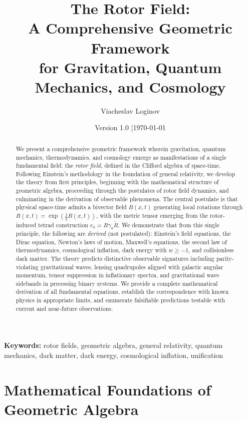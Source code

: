 \documentclass[11pt,a4paper]{article}
\title{\textbf{The Rotor Field:\\
A Comprehensive Geometric Framework\\
for Gravitation, Quantum Mechanics, and Cosmology}}
\author[1]{Viacheslav Loginov}
\affil[1]{Kyiv, Ukraine\\ \texttt{barthez.slavik@gmail.com}}
\date{\small Version 1.0 \quad|\quad \today}
\numberwithin{equation}{section}
\theoremstyle{plain}
\theoremstyle{definition}
\theoremstyle{remark}
\newcommand{\rev}[1]{\widetilde{#1}}       %
\begin{document}
\maketitle

\begin{abstract}
\noindent
We present a comprehensive geometric framework wherein gravitation, quantum mechanics, thermodynamics, and cosmology emerge as manifestations of a single fundamental field: the \emph{rotor field}, defined in the Clifford algebra of space-time. Following Einstein's methodology in the foundation of general relativity, we develop the theory from first principles, beginning with the mathematical structure of geometric algebra, proceeding through the postulates of rotor field dynamics, and culminating in the derivation of observable phenomena. The central postulate is that physical space-time admits a bivector field $B(x,t)$ generating local rotations through $R(x,t) = \exp(\frac{1}{2}B(x,t))$, with the metric tensor emerging from the rotor-induced tetrad construction $e_a = R\gamma_a\rev{R}$. We demonstrate that from this single principle, the following are \emph{derived} (not postulated): Einstein's field equations, the Dirac equation, Newton's laws of motion, Maxwell's equations, the second law of thermodynamics, cosmological inflation, dark energy with $w \geq -1$, and collisionless dark matter. The theory predicts distinctive observable signatures including parity-violating gravitational waves, lensing quadrupoles aligned with galactic angular momentum, tensor suppression in inflationary spectra, and gravitational wave sidebands in precessing binary systems. We provide a complete mathematical derivation of all fundamental equations, establish the correspondence with known physics in appropriate limits, and enumerate falsifiable predictions testable with current and near-future observations.
\end{abstract}

\noindent\textbf{Keywords:} rotor fields, geometric algebra, general relativity, quantum mechanics, dark matter, dark energy, cosmological inflation, unification

\tableofcontents
\newpage


\section{Mathematical Foundations of Geometric Algebra}
\label{sec:math-foundations}
\end{document}

